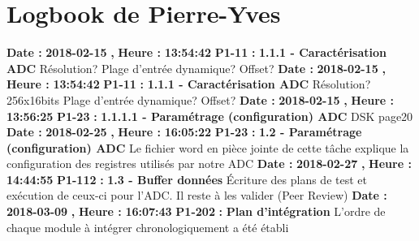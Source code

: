 \documentclass{article}%
\begin{document}
\section{Logbook de Pierre{-}Yves}%
\textbf{Date : }%
\textbf{2018{-}02{-}15}%
\textbf{,}%
\textbf{ Heure : }%
\textbf{13:54:42}%
\newline%
%
\textbf{P1{-}11 }%
\textbf{ : }%
\textbf{ 1.1.1 {-} Caractérisation ADC}%
\newline%
\newline%
%
Résolution?\newline%
Plage d'entrée dynamique?\newline%
Offset?\newline%
\newline%
%
\textbf{Date : }%
\textbf{2018{-}02{-}15}%
\textbf{,}%
\textbf{ Heure : }%
\textbf{13:54:42}%
\newline%
%
\textbf{P1{-}11 }%
\textbf{ : }%
\textbf{ 1.1.1 {-} Caractérisation ADC}%
\newline%
\newline%
%
Résolution? 256x16bits\newline%
Plage d'entrée dynamique?\newline%
Offset?\newline%
\newline%
%
\textbf{Date : }%
\textbf{2018{-}02{-}15}%
\textbf{,}%
\textbf{ Heure : }%
\textbf{13:56:25}%
\newline%
%
\textbf{P1{-}23 }%
\textbf{ : }%
\textbf{ 1.1.1.1 {-} Paramétrage (configuration) ADC}%
\newline%
\newline%
%
DSK page20\newline%
\newline%
%
\textbf{Date : }%
\textbf{2018{-}02{-}25}%
\textbf{,}%
\textbf{ Heure : }%
\textbf{16:05:22}%
\newline%
%
\textbf{P1{-}23 }%
\textbf{ : }%
\textbf{ 1.2 {-} Paramétrage (configuration) ADC}%
\newline%
\newline%
%
Le fichier word en pièce jointe de cette tâche explique la configuration des registres utilisés par notre ADC\newline%
\newline%
%
\textbf{Date : }%
\textbf{2018{-}02{-}27}%
\textbf{,}%
\textbf{ Heure : }%
\textbf{14:44:55}%
\newline%
%
\textbf{P1{-}112 }%
\textbf{ : }%
\textbf{ 1.3 {-} Buffer données}%
\newline%
\newline%
%
Écriture des plans de test et exécution de ceux{-}ci pour l'ADC. Il reste à les valider (Peer Review)\newline%
\newline%
%
\textbf{Date : }%
\textbf{2018{-}03{-}09}%
\textbf{,}%
\textbf{ Heure : }%
\textbf{16:07:43}%
\newline%
%
\textbf{P1{-}202 }%
\textbf{ : }%
\textbf{ Plan d'intégration}%
\newline%
\newline%
%
L'ordre de chaque module à intégrer chronologiquement a été établi\newline%
\newline%
%
\newpage
\end{document}
